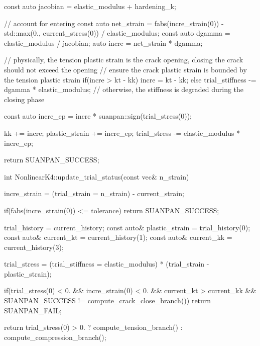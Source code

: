 \begin{cppcode}
{    const auto jacobian = elastic_modulus + hardening_k;

    // account for entering
    const auto net_strain = fabs(incre_strain(0)) - std::max(0., current_stress(0)) / elastic_modulus;
    const auto dgamma = elastic_modulus / jacobian;
    auto incre = net_strain * dgamma;

    // physically, the tension plastic strain is the crack opening, closing the crack should not exceed the opening
    // ensure the crack plastic strain is bounded by the tension plastic strain
    if(incre > kt - kk) incre = kt - kk;
    else trial_stiffness -= dgamma * elastic_modulus; // otherwise, the stiffness is degraded during the closing phase

    const auto incre_ep = incre * suanpan::sign(trial_stress(0));

    kk += incre;
    plastic_strain += incre_ep;
    trial_stress -= elastic_modulus * incre_ep;

    return SUANPAN_SUCCESS;
}

int NonlinearK4::update_trial_status(const vec& n_strain) {
    incre_strain = (trial_strain = n_strain) - current_strain;

    if(fabs(incre_strain(0)) <= tolerance) return SUANPAN_SUCCESS;

    trial_history = current_history;
    const auto& plastic_strain = trial_history(0);
    const auto& current_kt = current_history(1);
    const auto& current_kk = current_history(3);

    trial_stress = (trial_stiffness = elastic_modulus) * (trial_strain - plastic_strain);

    if(trial_stress(0) < 0. && incre_strain(0) < 0. && current_kt > current_kk && SUANPAN_SUCCESS != compute_crack_close_branch()) return SUANPAN_FAIL;

    return trial_stress(0) > 0. ? compute_tension_branch() : compute_compression_branch();
}
\end{cppcode}